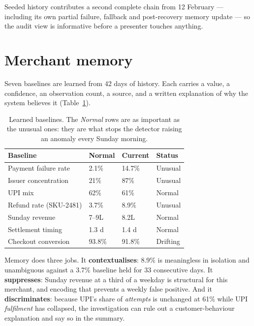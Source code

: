 \documentclass[10pt,twocolumn,a4paper]{article}
\newcommand{\rs}{\rupee}%
\newcommand{\rs}{\textrm{INR}\,}%
\begin{document}
Seeded history contributes a second complete chain from 12 February --- including
its own partial failure, fallback and post-recovery memory update --- so the
audit view is informative before a presenter touches anything.

\section{Merchant memory}
\label{sec:memory}

Seven baselines are learned from 42 days of history. Each carries a value, a
confidence, an observation count, a source, and a written explanation of why the
system believes it (Table~\ref{tab:memory}).

\begin{table}[h]
\centering
\small
\begin{tabular}{@{}l l l l@{}}
\toprule
\textbf{Baseline} & \textbf{Normal} & \textbf{Current} & \textbf{Status} \\
\midrule
Payment failure rate   & 2.1\%   & 14.7\%  & Unusual \\
Issuer concentration   & 21\%    & 87\%    & Unusual \\
UPI mix                & 62\%    & 61\%    & Normal \\
Refund rate (SKU-2481) & 3.7\%   & 8.9\%   & Unusual \\
Sunday revenue         & \rs{}7--9L & \rs{}8.2L & Normal \\
Settlement timing      & 1.3 d   & 1.4 d   & Normal \\
Checkout conversion    & 93.8\%  & 91.8\%  & Drifting \\
\bottomrule
\end{tabular}
\caption{Learned baselines. The \emph{Normal} rows are as important as the
unusual ones: they are what stops the detector raising an anomaly every Sunday
morning.}
\label{tab:memory}
\end{table}

Memory does three jobs. It \textbf{contextualises}: 8.9\% is meaningless in
isolation and unambiguous against a 3.7\% baseline held for 33 consecutive days.
It \textbf{suppresses}: Sunday revenue at a third of a weekday is structural for
this merchant, and encoding that prevents a weekly false positive. And it
\textbf{discriminates}: because UPI's share of \emph{attempts} is unchanged at
61\% while UPI \emph{fulfilment} has collapsed, the investigation can rule out a
customer-behaviour explanation and say so in the summary.
\end{document}
